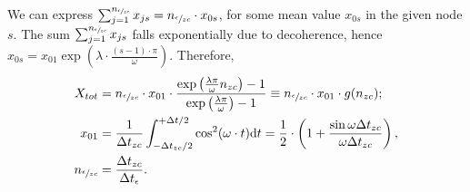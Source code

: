 \documentclass{article}
\newcommand{\dt}{\Delta t}
\newcommand{\dtm}{\dt_{\meas}}
\begin{document}
We can express $\sum_{j=1}^{n_{\sfrac{\epsilon}{zc}}} x_{js} = n_{\sfrac{\epsilon}{zc}} \cdot x_{0s}$, for some mean value $x_{0s}$ in the given node $s$. The sum $\sum_{j=1}^{n_{\sfrac{\epsilon}{zc}}} x_{js}$ falls exponentially due to decoherence, hence $x_{0s} = x_{01}\exp{(\lambda\cdot \frac{(s-1)\cdot\pi}{\omega})}$. Therefore,
\begin{align}
	X_{tot} & = \Nmnd\cdot x_{01} \cdot \frac{\exp{\bkt{\frac{\lambda\pi}{\omega}\Nnd}}-1}{\exp{\bkt{\frac{\lambda\pi}{\omega}}}-1} 
	\equiv \Nmnd \cdot x_{01}\cdot g(\Nnd); \label{eq:FItot}\\
	x_{01}  & = \frac{1}{\dtnd}\int_{-\dtnd/2}^{+\dt/2}\cos^2(\omega\cdot t)\td t = \frac12\cdot \bkt{1 + \frac{\sin\omega\dtnd}{\omega\dtnd}},                                    \label{eq:MeanFIZC}   \\
	\Nmnd   & = \frac{\dtnd}{\dtm}. \label{eq:NumMeasNode}
\end{align}
\end{document}

